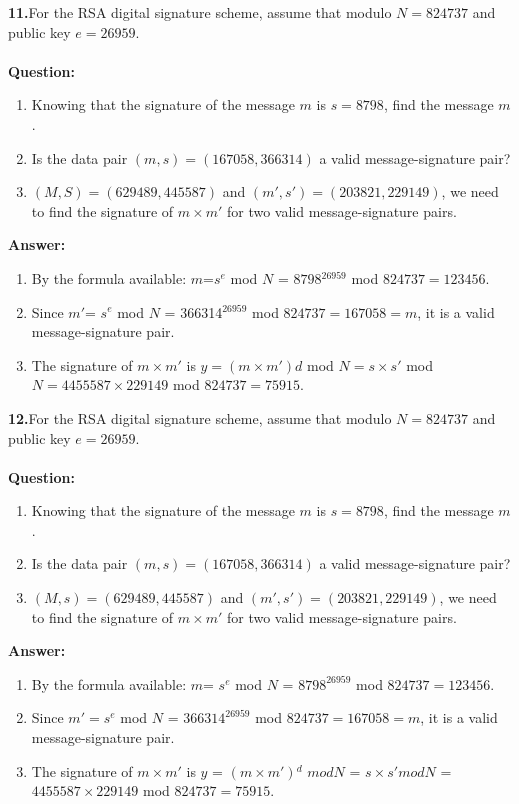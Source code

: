 \documentclass[paper=a4, fontsize=11pt]{scrartcl} %
\numberwithin{equation}{section} %
\numberwithin{figure}{section} %
\numberwithin{table}{section} %
\begin{document}
\textbf{11.}For the RSA digital signature scheme, assume that modulo $N = 824737$ and public key $e = 26959$.
\\
\\
\textbf{Question:}
\begin{enumerate}
\item Knowing that the signature of the message $m$ is $s = 8798$, find the message $m$.
\item Is the data pair $(m, s) = (167058, 366314)$ a valid message-signature pair?
\item $(M,S) = (629489, 445587)$ and $(m', s') = (203821,229149)$, we need to find the signature of $m \times m'$ for two valid message-signature pairs.
\end{enumerate}

\textbf{Answer:}
\begin{enumerate}
\item By the formula available: $m$=$s^e$ mod $N$ = $8798$$^{26959}$ mod $824737 = 123456$.
\item Since $m'$= $s^e$ mod $N$ = 366314$^{26959}$ mod $824737 = 167058 = m$, it is a valid message-signature pair.
\item The signature of $m \times m'$ is $y = (m \times m') d$ mod $N = s \times s'$ mod $N = 4455587 \times 229149$ mod $824737 = 75915$.
\end{enumerate}

\textbf{12.}For the RSA digital signature scheme, assume that modulo $N = 824737$ and public key $e = 26959$.
\\
\\
\textbf{Question:}
\begin{enumerate}
\item Knowing that the signature of the message $m$ is $s = 8798$, find the message $m$.
\item Is the data pair $(m, s) = (167058, 366314)$ a valid message-signature pair?
\item $(M, s) = (629489, 445587)$ and $(m', s') = (203821,229149)$, we need to find the signature of $m \times m'$ for two valid message-signature pairs.
\end{enumerate}

\textbf{Answer:}
\begin{enumerate}
\item By the formula available: $m$= $s^e$ mod $N$ = $8798^{26959}$ mod $824737 = 123456$.
\item Since $m'= s^e$ mod $N$ = $366314^{26959}$ mod $824737 = 167058 = m$, it is a valid message-signature pair.
\item The signature of $m \times m'$ is $y$ = $(m \times m')$$^ d$ $mod N$ = $s \times s' mod N$ = $4455587 \times 229149$ mod $824737 = 75915$.
\end{enumerate}
\end{document}
